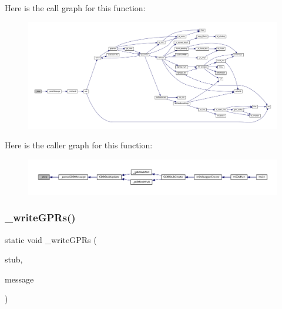 Here is the call graph for this function\+:
\nopagebreak
\begin{figure}[H]
\begin{center}
\leavevmode
\includegraphics[width=350pt]{gdb-stub_8c_ae28066e90628c8bf0560863573506b06_cgraph}
\end{center}
\end{figure}
Here is the caller graph for this function\+:
\nopagebreak
\begin{figure}[H]
\begin{center}
\leavevmode
\includegraphics[width=350pt]{gdb-stub_8c_ae28066e90628c8bf0560863573506b06_icgraph}
\end{center}
\end{figure}
\mbox{\label{gdb-stub_8c_aa692d1765e005bcc6fa510f74a85c598}} 
\subsubsection{\texorpdfstring{\+\_\+write\+G\+P\+Rs()}{\_writeGPRs()}}
{\footnotesize\ttfamily static void \+\_\+write\+G\+P\+Rs (\begin{DoxyParamCaption}\item[{struct G\+D\+B\+Stub $\ast$}]{stub,  }\item[{const char $\ast$}]{message }\end{DoxyParamCaption})\hspace{0.3cm}{\ttfamily [static]}}

